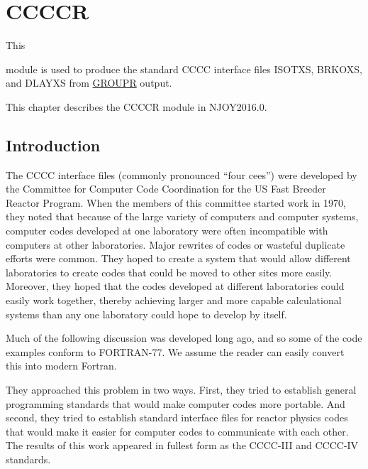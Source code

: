\section{CCCCR}
\label{sCCCCR}

\hypertarget{sCCCCRhy}{This}
module is used to produce the standard CCCC interface files
ISOTXS, BRKOXS, and DLAYXS from
\hyperlink{sGROUPRhy}{GROUPR} output.

This chapter describes the CCCCR module in NJOY2016.0.

\subsection{Introduction}
\label{ssCCCCR_intro}

The CCCC interface files (commonly pronounced ``four cees'') were
developed by the Committee for Computer Code Coordination for the
US Fast Breeder Reactor Program.
  When
the members of this committee started work in 1970,
they noted that because of the large variety of
computers and computer systems, computer codes developed at one
laboratory were often incompatible with computers at other
laboratories.  Major rewrites of codes or wasteful duplicate efforts
were common.  They hoped to create a system that would allow different
laboratories to create codes that could be moved to other sites more
easily.  Moreover, they hoped that the codes developed at different
laboratories could easily work together, thereby achieving larger and
more capable calculational systems than any one laboratory could hope to
develop by itself.

Much of the following discussion was developed long ago, and so some
of the code examples conform to FORTRAN-77.  We assume the reader can
easily convert this into modern Fortran.

They approached this problem in two ways.  First, they tried to establish
general programming standards that would make computer codes more
portable.  And second, they tried to establish standard interface files
for reactor physics codes that would make it easier for computer codes to
communicate with each other.  The results of this work appeared in fullest
form as the CCCC-III and CCCC-IV standards\cite{CCCC3,CCCC4}.

